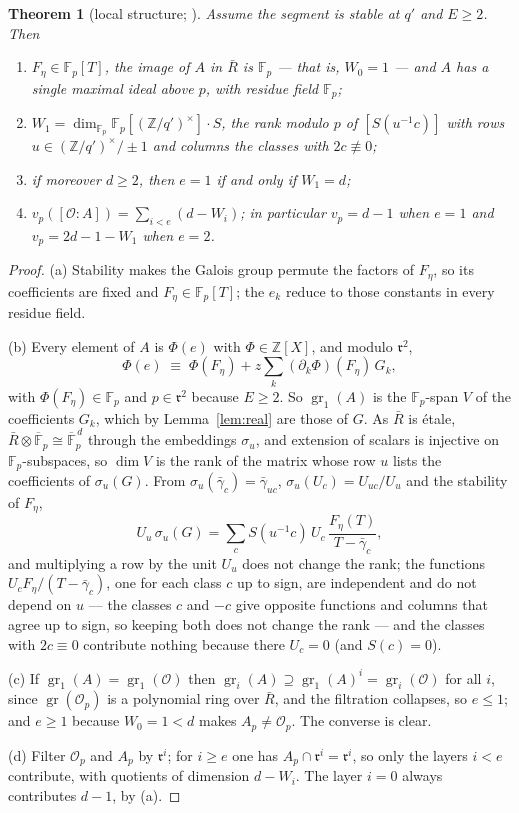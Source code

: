 \documentclass[11pt,a4paper]{article}
\newtheorem{theorem}{Theorem}
\theoremstyle{definition}
\newcommand{\ZZ}{\mathbb{Z}}
\newcommand{\FF}{\mathbb{F}}
\newcommand{\cO}{\mathcal{O}}
\newcommand{\rad}{\mathfrak{r}}
\newcommand{\gr}{\operatorname{gr}}
\begin{document}
\begin{theorem}[local structure; {\cite[Thm.~5]{Cond}}]\label{thm:loc}
Assume the segment is stable at $q'$ and $E\ge2$. Then
\begin{enumerate}
\item[(a)] $F_\eta\in\FF_p[T]$, the image of $A$ in $\bar R$ is $\FF_p$ --- that is, $W_0=1$ --- and $A$
has a single maximal ideal above $p$, with residue field $\FF_p$;
\item[(b)] $W_1=\dim_{\FF_p}\FF_p[(\ZZ/q')^\times]\cdot S$, the rank modulo $p$ of
$[S(u^{-1}c)]$ with rows $u\in(\ZZ/q')^\times/\pm1$ and columns the classes with $2c\not\equiv0$;
\item[(c)] if moreover $d\ge2$, then $e=1$ if and only if $W_1=d$;
\item[(d)] $v_p([\cO:A])=\sum_{i<e}(d-W_i)$; in particular $v_p=d-1$ when $e=1$ and
$v_p=2d-1-W_1$ when $e=2$.
\end{enumerate}
\end{theorem}

\begin{proof}
(a) Stability makes the Galois group permute the factors of $F_\eta$, so its coefficients are fixed
and $F_\eta\in\FF_p[T]$; the $e_k$ reduce to those constants in every residue field.

(b) Every element of $A$ is $\Phi(e)$ with $\Phi\in\ZZ[X]$, and modulo $\rad^2$,
\[
\Phi(e)\;\equiv\;\Phi(F_\eta)+z\sum_k(\partial_k\Phi)(F_\eta)\,G_k ,
\]
with $\Phi(F_\eta)\in\FF_p$ and $p\in\rad^2$ because $E\ge2$. So $\gr_1(A)$ is the $\FF_p$-span $V$ of
the coefficients $G_k$, which by Lemma~\ref{lem:real} are those of $G$.
As $\bar R$ is \'etale, $\bar R\otimes\overline{\FF}_p\cong\overline{\FF}_p^{\,d}$ through the
embeddings $\sigma_u$, and extension of scalars is injective on $\FF_p$-subspaces, so $\dim V$ is
the rank of the matrix whose row $u$ lists the coefficients of $\sigma_u(G)$. From
$\sigma_u(\bar\gamma_c)=\bar\gamma_{uc}$, $\sigma_u(U_c)=U_{uc}/U_u$ and the stability of
$F_\eta$,
\[
U_u\,\sigma_u(G)=\sum_c S(u^{-1}c)\,U_c\,\frac{F_\eta(T)}{T-\bar\gamma_c},
\]
and multiplying a row by the unit $U_u$ does not change the rank; the functions
$U_cF_\eta/(T-\bar\gamma_c)$, one for each class $c$ up to sign, are independent and do not depend
on $u$ --- the classes $c$ and $-c$ give opposite functions and columns that agree up to sign, so
keeping both does not change the rank --- and the classes with $2c\equiv0$ contribute nothing
because there $U_c=0$ (and $S(c)=0$).

(c) If $\gr_1(A)=\gr_1(\cO)$ then $\gr_i(A)\supseteq\gr_1(A)^i=\gr_i(\cO)$ for all $i$, since
$\gr(\cO_p)$ is a polynomial ring over $\bar R$, and the filtration collapses, so $e\le1$; and
$e\ge1$ because $W_0=1<d$ makes $A_p\ne\cO_p$. The converse is clear.

(d) Filter $\cO_p$ and $A_p$ by $\rad^i$; for $i\ge e$ one has $A_p\cap\rad^i=\rad^i$, so only the
layers $i<e$ contribute, with quotients of dimension $d-W_i$. The layer $i=0$ always contributes
$d-1$, by (a).
\end{proof}
\end{document}
